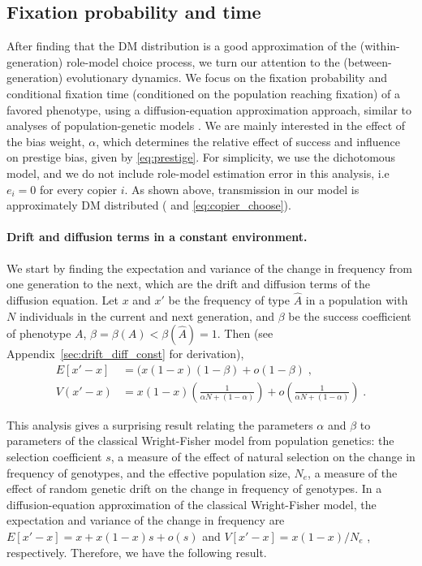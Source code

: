 \documentclass[12pt]{extarticle}
\begin{document}
\subsection*{Fixation probability and time}
After finding that the DM distribution is a good approximation of the (within-generation) role-model choice process, we turn our attention to the (between-generation) evolutionary dynamics.
We focus on the fixation probability and conditional fixation time (conditioned on the population reaching fixation) of a favored phenotype, using a diffusion-equation approximation approach, similar to analyses of population-genetic models \citep{kimura,kimura_average,otto_fixation}.
We are mainly interested in the effect of the bias weight, $\alpha$, which determines the relative effect of success and influence on prestige bias, given by \cref{eq:prestige}.
For simplicity, we use the dichotomous model, and we do not include role-model estimation error in this analysis, i.e $e_i=0$ for every copier $i$.
As shown above, transmission in our model is approximately DM distributed ( and \cref{eq:copier_choose}).

\paragraph{Drift and diffusion terms in a constant environment.}
We start by finding the expectation and variance of the change in frequency from one generation to the next, which are the drift and diffusion terms of the diffusion equation.
Let $x$ and $x'$ be the frequency of type $\hat{A}$ in a population with $N$ individuals in the current and next generation, and  $\beta$ be the success coefficient of phenotype $A$, $\beta = \beta(A) < \beta(\hat{A}) = 1$.
Then (see Appendix~\ref{sec:drift_diff_const} for derivation),
\begin{equation}\begin{aligned}
E[x'-x] &= (x(1-x)(1-\beta) + o(1-\beta)  \;, 
\\
V(x'-x) &= x(1-x)\left(\frac{1}{\alpha N + (1-\alpha)}\right) + o\left(\frac{1}{\alpha N + (1-\alpha)}\right) \;.
\end{aligned}\end{equation} 

This analysis gives a surprising result relating the parameters $\alpha$ and $\beta$ to parameters of the classical Wright-Fisher model from population genetics:
the selection coefficient $s$, a measure of the effect of natural selection on the change in frequency of genotypes, and the effective population size, $N_e$, a measure of the effect of random genetic drift on the change in frequency of genotypes. 
In a diffusion-equation approximation of the classical Wright-Fisher model, the expectation and variance of the change in frequency are $E[x'-x]=x+x(1-x)s+o(s)$ and $V[x'-x]=x(1-x)/N_e$ \citep[eq.~7]{kimura}{, respectively}. 
Therefore, we have the following result.\\
\end{document}
